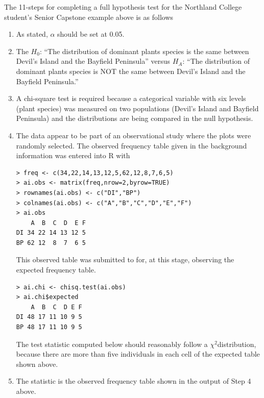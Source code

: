 \documentclass[10pt,openany]{book}\usepackage[]{graphicx}\usepackage[]{color}
\makeatletter
\newenvironment{kframe}{%
 \def\at@end@of@kframe{}%
 \ifinner\ifhmode%
  \def\at@end@of@kframe{\end{minipage}}%
  \begin{minipage}{\columnwidth}%
 \fi\fi%
 \def\FrameCommand##1{\hskip\@totalleftmargin \hskip-\fboxsep
 \colorbox{shadecolor}{##1}\hskip-\fboxsep
     \hskip-\linewidth \hskip-\@totalleftmargin \hskip\columnwidth}%
 \MakeFramed {\advance\hsize-\width
   \@totalleftmargin\z@ \linewidth\hsize
   \@setminipage}}%
 {\par\unskip\endMakeFramed%
 \at@end@of@kframe}
\newenvironment{knitrout}{}{} %
\makeatother
\begin{document}
The 11-steps  for completing a full hypothesis test for the Northland College student's Senior Capstone example above is as follows
  \begin{enumerate}
    \item As stated, $\alpha$ should be set at 0.05.
    \item The $H_{0}$: ``The distribution of dominant plants species is the same between Devil's Island and the Bayfield Peninsula'' versus $H_{A}$: ``The distribution of dominant plants species is NOT the same between Devil's Island and the Bayfield Peninsula.''
    \item A chi-square test is required because a categorical variable with six levels (plant species) was measured on two populations (Devil's Island and Bayfield Peninsula) and the distributions are being compared in the null hypothesis.
    \item The data appear to be part of an observational study where the plots were randomly selected.  The observed frequency table given in the background information was entered into R with
\begin{knitrout}
\color{fgcolor}\begin{kframe}
\begin{verbatim}
> freq <- c(34,22,14,13,12,5,62,12,8,7,6,5)
> ai.obs <- matrix(freq,nrow=2,byrow=TRUE)
> rownames(ai.obs) <- c("DI","BP")
> colnames(ai.obs) <- c("A","B","C","D","E","F")
> ai.obs
    A  B  C  D  E F
DI 34 22 14 13 12 5
BP 62 12  8  7  6 5
\end{verbatim}
\end{kframe}
\end{knitrout}
This observed table was submitted to  for, at this stage, observing the expected frequency table.
\begin{knitrout}
\color{fgcolor}\begin{kframe}
\begin{verbatim}
> ai.chi <- chisq.test(ai.obs)
> ai.chi$expected
    A  B  C  D E F
DI 48 17 11 10 9 5
BP 48 17 11 10 9 5
\end{verbatim}
\end{kframe}
\end{knitrout}
The test statistic computed below should reasonably follow a $\chi^{2}$distribution, because there are more than five individuals in each cell of the expected table shown above.
    \item The statistic is the observed frequency table shown in the output of Step 4 above.

\end{enumerate}
\end{document}
